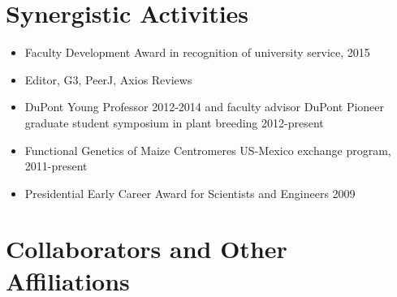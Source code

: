 \documentclass[10pt]{article}
\newcommand{\ignore}[1]{}
\begin{document}
\section{Synergistic Activities}

\begin{itemize} \setlength{\itemsep}{0pt} \setlength{\parskip}{2pt} \setlength{\parsep}{0pt}
\item Faculty Development Award in recognition of university service, 2015
\item Editor, G3, PeerJ, Axios Reviews
\item DuPont Young Professor 2012-2014 and faculty advisor DuPont Pioneer graduate student symposium in plant breeding 2012-present


\item Functional Genetics of Maize Centromeres US-Mexico exchange program, 2011-present

\item Presidential Early Career Award for Scientists and Engineers 2009

\end{itemize}

\section{Collaborators and Other Affiliations}
\end{document}
